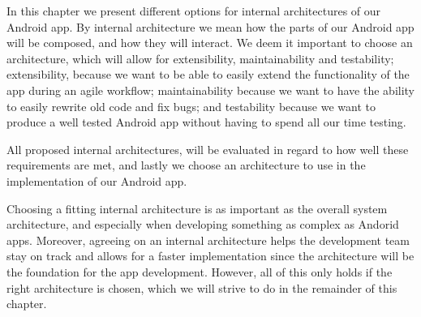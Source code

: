 In this chapter we present different options for internal architectures of our Android app.
By internal architecture we mean how the parts of our Android app will be composed, and how they will interact.
We deem it important to choose an architecture, which will allow for extensibility, maintainability and testability;
extensibility, because we want to be able to easily extend the functionality of the app during an agile workflow;
maintainability because we want to have the ability to easily rewrite old code and fix bugs;
and testability because we want to produce a well tested Android app without having to spend all our time testing.

All proposed internal architectures, will be evaluated in regard to how well these requirements are met, and lastly we choose an architecture to use in the implementation of our Android app.

Choosing a fitting internal architecture is as important as the overall system architecture, and especially when developing something as complex as Andorid apps.
Moreover, agreeing on an internal architecture helps the development team stay on track and allows for a faster implementation since the architecture will be the foundation for the app development.
However, all of this only holds if the right architecture is chosen, which we will strive to do in the remainder of this chapter.
